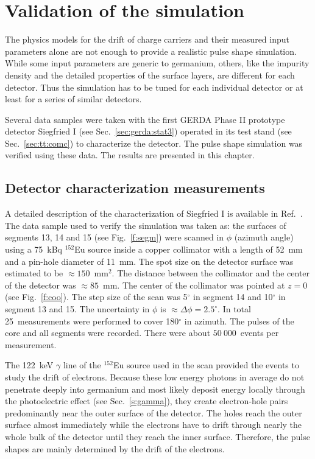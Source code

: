 \documentclass[epj]{svjour}
\begin{document}
\section{Validation of the simulation}
\label{s:psv}

The physics models \cite{miha, bart} for the drift of charge carriers
and their measured input parameters \cite{miha, bart} alone are not
enough to provide a realistic pulse shape simulation. While some input
parameters are generic to germanium, others, like the impurity density
and the detailed properties of the surface layers, are different for
each detector. Thus the simulation has to be tuned for each individual
detector or at least for a series of similar detectors.

Several data samples were taken with the first GERDA Phase II
prototype detector Siegfried I (see Sec.~\ref{sec:gerda:stat3})
operated in its test stand (see Sec.~\ref{sec:tt:comc}) to
characterize the detector. The pulse shape simulation was verified
using these data. The results are presented in this chapter.
%

\subsection{Detector characterization measurements}
\label{s:char}
A detailed description of the characterization of Siegfried I is
available in Ref.~\cite{Sie07}. The data sample used to verify the
simulation was taken as: the surfaces of segments 13, 14 and 15 (see
Fig.~\ref{f:segm}) were scanned in $\phi$ (azimuth angle) using a
75~kBq $^{152}$Eu source inside a copper collimator with a length of
52~mm and a pin-hole diameter of 11~mm. The spot size on the detector
surface was estimated to be $\approx 150$~mm$^{2}$. The distance
between the collimator and the center of the detector was $\approx
85$~mm. The center of the collimator was pointed at $z = 0$ (see
Fig.~\ref{f:coo}).  The step size of the scan was 5$^{\circ}$ in
segment 14 and 10$^{\circ}$ in segment 13 and 15. The uncertainty in
$\phi$ is $\approx \Delta \phi=2.5^{\circ}$. In total 25~measurements
were performed to cover 180$^{\circ}$ in azimuth. The pulses of the
core and all segments were recorded. There were about $50\ 000$~events
per measurement.

The 122~keV $\gamma$ line of the $^{152}$Eu source used in the scan
provided the events to study the drift of electrons. Because these low
energy photons in average do not penetrate deeply into germanium and
most likely deposit energy locally through the photoelectric effect
(see Sec.~\ref{s:gamma}), they create electron-hole pairs
predominantly near the outer surface of the detector. The holes reach
the outer surface almost immediately while the electrons have to drift
through nearly the whole bulk of the detector until they reach the
inner surface. Therefore, the pulse shapes are mainly determined by
the drift of the electrons.
\end{document}
